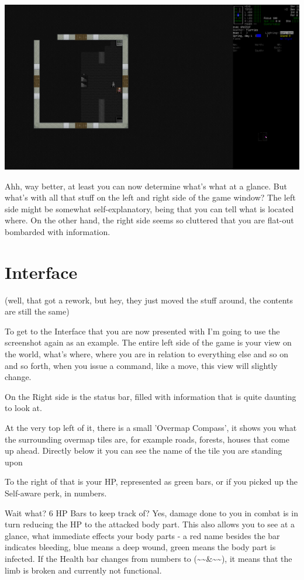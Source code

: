 \documentclass[11pt]{report}
\begin{document}
\includegraphics[width=\textwidth]{04}

Ahh, way better, at least you can now determine what's what at a glance. But what's with all that stuff on the left and right side of the game window? The left side might be somewhat self-explanatory, being that you can tell what is located where. On the other hand, the right side seems so cluttered that you are flat-out bombarded with information.

\section{Interface}

(well, that got a rework, but hey, they just moved the stuff around, the contents are still the same)

To get to the Interface that you are now presented with I'm going to use the screenshot again as an example.
The entire left side of the game is your view on the world, what's where, where you are in relation to everything else and so on and so forth, when you issue a command, like a move, this view will slightly change.

On the Right side is the status bar, filled with information that is quite daunting to look at.

At the very top left of it, there is a small 'Overmap Compass', it shows you what the surrounding overmap tiles are, for example roads, forests, houses that come up ahead. Directly below it you can see the name of the tile you are standing upon

To the right of that is your HP, represented as green bars, or if you picked up the Self-aware perk, in numbers.

Wait what? 6 HP Bars to keep track of? Yes, damage done to you in combat is in turn reducing the HP to the attacked body part. This also allows you to see at a glance, what immediate effects your body parts - a red name besides the bar indicates bleeding, blue means a deep wound, green means the body part is infected. If the Health bar changes from numbers to (\~{}\~{}\&\~{}\~{}), it means that the limb is broken and currently not functional.
\end{document}
